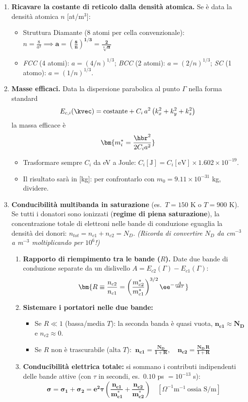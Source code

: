 \begin{enumerate}
\item \textbf{Ricavare la costante di reticolo dalla densità atomica.}
Se è data la densità atomica $n$ [at/m$^3$]:
\begin{itemize}
    \item Struttura Diamante (8 atomi per cella convenzionale): $n=\frac{8}{a^3}\implies \bm{a=\left(\frac8n\right)^{1/3}=\frac{2}{\sqrt[3]{n}}}$
    \item \textit{FCC} (4 atomi): $a=(4/n)^{1/3}$; \quad \textit{BCC} (2 atomi): $a=(2/n)^{1/3}$; \quad \textit{SC} (1 atomo): $a=(1/n)^{1/3}$.
\end{itemize}

\item \textbf{Masse efficaci.} Data la dispersione parabolica al punto $\Gamma$ nella forma standard
\[ E_{c,i}(\kvec)=\text{costante}+C_i\,a^2\left(k_x^2+k_y^2+k_z^2\right) \]
la massa efficace è
\[ \bm{m_i^* = \frac{\hbr^2}{2C_ia^2}} \]
\begin{itemize}
    \item Trasformare sempre $C_i$ da eV a Joule: $C_i[\text{J}]=C_i[\text{eV}]\times1.602\times10^{-19}$.
    \item Il risultato sarà in [kg]: per confrontarlo con $m_0=9.11\times10^{-31}$ kg, dividere.
\end{itemize}

\item \textbf{Conducibilità multibanda in saturazione} (es.\ $T=150$ K o $T=900$ K).
Se tutti i donatori sono ionizzati (\textbf{regime di piena saturazione}), la concentrazione totale di elettroni nelle bande di conduzione eguaglia la densità dei donori: $n_{tot}=n_{c1}+n_{c2}=N_D$.
\textit{(Ricorda di convertire $N_D$ da cm$^{-3}$ a m$^{-3}$ moltiplicando per $10^6$!)}
\begin{enumerate}
    \item \textbf{Rapporto di riempimento tra le bande ($R$).} Date due bande di conduzione separate da un dislivello $A=E_{c2}(\Gamma)-E_{c1}(\Gamma)$:
    \[ \bm{R\equiv\frac{n_{c2}}{n_{c1}} = \left(\frac{m_{c2}^*}{m_{c1}^*}\right)^{3/2}\ee^{-\frac{A}{\kB T}}} \]
    \item \textbf{Sistemare i portatori nelle due bande:}
    \begin{itemize}
        \item Se $R\ll1$ (bassa/media $T$): la seconda banda è quasi vuota, $\bm{n_{c1}\approx N_D}$ e $n_{c2}\approx0$.
        \item Se $R$ non è trascurabile (alta $T$): $\ \bm{n_{c1}=\frac{N_D}{1+R}}, \quad \bm{n_{c2}=\frac{N_D\,R}{1+R}}$
    \end{itemize}
    \item \textbf{Conducibilità elettrica totale:} si sommano i contributi indipendenti delle bande attive (con $\tau$ in secondi, es.\ $0.10$ ps $=10^{-13}$ s):
    \[ \bm{\sigma = \sigma_1+\sigma_2 = e^2\tau\left(\frac{n_{c1}}{m_{c1}^*}+\frac{n_{c2}}{m_{c2}^*}\right)}\quad [\Omega^{-1}\text{m}^{-1}\ \text{ossia S/m}] \]
\end{enumerate}


\end{enumerate}
